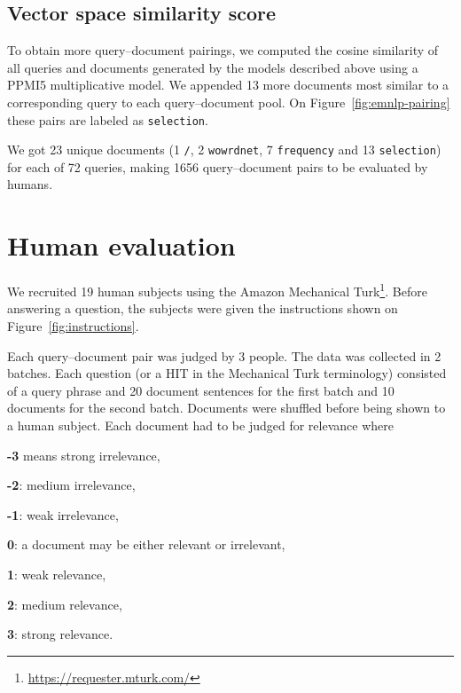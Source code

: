\subsection{Vector space similarity score}

To obtain more query--document pairings, we computed the cosine similarity of all queries and documents generated by the models described above using a PPMI5 multiplicative model. We appended 13 more documents most similar to a corresponding query to each query--document pool. On Figure~\ref{fig:emnlp-pairing} these pairs are labeled as \texttt{selection}.

We got 23 unique documents (1 \texttt{\emnlp/}, 2 \texttt{wowrdnet}, 7
\texttt{frequency} and 13 \texttt{selection}) for each of 72 queries, making
1656 query--document pairs to be evaluated by humans.

\section{Human evaluation}
\label{sec:human-evaluation}



We recruited 19 human subjects using the Amazon Mechanical Turk\footnote{\url{https://requester.mturk.com/}}. Before answering a question, the subjects were given the instructions shown on Figure~\ref{fig:instructions}.

Each query--document pair was judged by 3 people. The data was collected in 2 batches. Each question (or a HIT in the Mechanical Turk terminology) consisted of a query phrase and 20 document sentences for the first batch and 10 documents for the second batch. Documents were shuffled before being shown to a human subject. Each document had to be judged for relevance where
\begin{compactitem}
\item \textbf{-3} means strong irrelevance,
\item \textbf{-2}: medium irrelevance,
\item \textbf{-1}: weak irrelevance,
\item  \textbf{0}: a document may be either relevant or irrelevant,
\item  \textbf{1}: weak relevance,
\item  \textbf{2}: medium relevance,
\item  \textbf{3}: strong relevance.
\end{compactitem}

